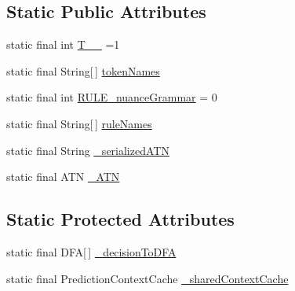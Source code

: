 \subsection*{Static Public Attributes}
\begin{DoxyCompactItemize}
\item 
static final int \hyperlink{classit_1_1emarolab_1_1cagg_1_1core_1_1language_1_1parser_1_1ANTLRInterface_1_1ANTLRGenerated_1_1CAGGSyntaxDefinitionParser_ac5844a89696b459815705462a815023c}{T\-\_\-\-\_} =1
\item 
static final String\mbox{[}$\,$\mbox{]} \hyperlink{classit_1_1emarolab_1_1cagg_1_1core_1_1language_1_1parser_1_1ANTLRInterface_1_1ANTLRGenerated_1_1CAGGSyntaxDefinitionParser_abbaa329c254780f04937542ecfb45e91}{token\-Names}
\item 
static final int \hyperlink{classit_1_1emarolab_1_1cagg_1_1core_1_1language_1_1parser_1_1ANTLRInterface_1_1ANTLRGenerated_1_1CAGGSyntaxDefinitionParser_ae26826532ab40e3cfaeb9bf3ec58cd01}{R\-U\-L\-E\-\_\-nuance\-Grammar} = 0
\item 
static final String\mbox{[}$\,$\mbox{]} \hyperlink{classit_1_1emarolab_1_1cagg_1_1core_1_1language_1_1parser_1_1ANTLRInterface_1_1ANTLRGenerated_1_1CAGGSyntaxDefinitionParser_afd9ffca04ae874a3ae506c1d068612dc}{rule\-Names}
\item 
static final String \hyperlink{classit_1_1emarolab_1_1cagg_1_1core_1_1language_1_1parser_1_1ANTLRInterface_1_1ANTLRGenerated_1_1CAGGSyntaxDefinitionParser_a01a140ace8c3e0ef65a9e19cf8df4700}{\-\_\-serialized\-A\-T\-N}
\item 
static final A\-T\-N \hyperlink{classit_1_1emarolab_1_1cagg_1_1core_1_1language_1_1parser_1_1ANTLRInterface_1_1ANTLRGenerated_1_1CAGGSyntaxDefinitionParser_a279f5cba6427e06c55aecf23e7717377}{\-\_\-\-A\-T\-N}
\end{DoxyCompactItemize}
\subsection*{Static Protected Attributes}
\begin{DoxyCompactItemize}
\item 
static final D\-F\-A\mbox{[}$\,$\mbox{]} \hyperlink{classit_1_1emarolab_1_1cagg_1_1core_1_1language_1_1parser_1_1ANTLRInterface_1_1ANTLRGenerated_1_1CAGGSyntaxDefinitionParser_aa5fe3eaf736044722fc94bd4c4830824}{\-\_\-decision\-To\-D\-F\-A}
\item 
static final Prediction\-Context\-Cache \hyperlink{classit_1_1emarolab_1_1cagg_1_1core_1_1language_1_1parser_1_1ANTLRInterface_1_1ANTLRGenerated_1_1CAGGSyntaxDefinitionParser_a2171af10d3e4365a350d8b40fda4898d}{\-\_\-shared\-Context\-Cache}
\end{DoxyCompactItemize}


